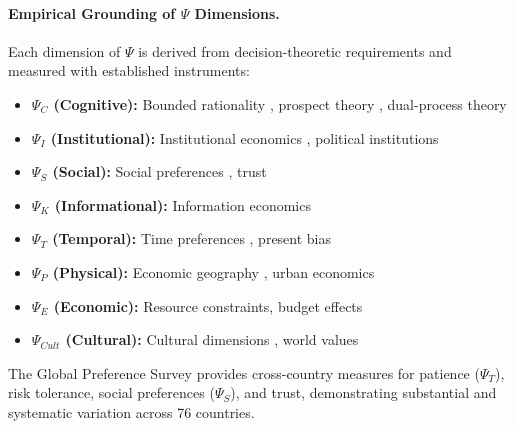 
\paragraph{Empirical Grounding of $\Psi$ Dimensions.}
Each dimension of $\Psi$ is derived from decision-theoretic requirements and
measured with established instruments:

\begin{itemize}
  \item \textbf{$\Psi_C$ (Cognitive):} Bounded rationality \citep{simon1962},
        prospect theory \citep{kahnemantversky1979}, dual-process theory
        \citep{kahneman2011}
  \item \textbf{$\Psi_I$ (Institutional):} Institutional economics \citep{PAP-north1990institutions},
        political institutions \citep{acemoglurobinson2012}
  \item \textbf{$\Psi_S$ (Social):} Social preferences \citep{fehrcharness2024},
        trust \citep{knackkeefer1997}
  \item \textbf{$\Psi_K$ (Informational):} Information economics
        \citep{akerlof1970,stiglitz2000}
  \item \textbf{$\Psi_T$ (Temporal):} Time preferences \citep{frederick2002time},
        present bias \citep{laibson1997}
  \item \textbf{$\Psi_P$ (Physical):} Economic geography \citep{krugman1991},
        urban economics \citep{glaeser2008}
  \item \textbf{$\Psi_E$ (Economic):} Resource constraints, budget effects
  \item \textbf{$\Psi_{Cult}$ (Cultural):} Cultural dimensions \citep{hofstede1980},
        world values \citep{inglehart2014}
\end{itemize}

The Global Preference Survey \citep{falk2018} provides cross-country measures
for patience ($\Psi_T$), risk tolerance, social preferences ($\Psi_S$), and
trust, demonstrating substantial and systematic variation across 76 countries.


